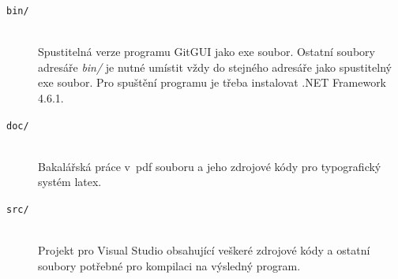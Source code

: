 \documentclass[
  biblatex,
  glossaries,
  index
]{kidiplom}
\begin{document}
\begin{description}

\item[\texttt{bin/}] \hfill \\
  Spustitelná verze programu GitGUI jako exe soubor. Ostatní soubory adresáře \textit{bin/} je nutné umístit vždy do stejného adresáře jako spustitelný exe soubor. Pro spuštění programu je třeba instalovat .NET Framework 4.6.1.
  
\item[\texttt{doc/}] \hfill \\
  Bakalářská práce v~pdf souboru a jeho zdrojové kódy pro typografický systém latex.
  
\item[\texttt{src/}] \hfill \\
Projekt pro Visual Studio obsahující veškeré zdrojové kódy a ostatní soubory potřebné pro kompilaci na výsledný program.

\end{description}


\printglossary


\nocite{*}
\printbibliography

%
%

\printindex
\end{document}

